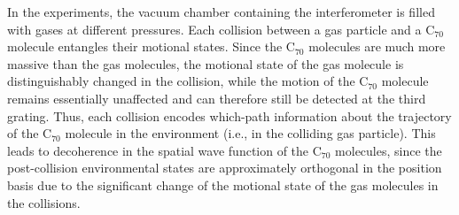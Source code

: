 \documentclass[twocolumn,aps,floatfix,amsmath,amssymb,showpacs,nofootinbib]{revtex4}
\begin{document}
In the experiments, the vacuum chamber containing the interferometer
is filled with gases at different pressures. Each collision between a
gas particle and a C$_{70}$ molecule entangles their motional states.
Since the C$_{70}$ molecules are much more massive than the gas
molecules, the motional state of the gas molecule is distinguishably
changed in the collision, while the motion of the C$_{70}$ molecule
remains essentially unaffected and can therefore still be detected at
the third grating. Thus, each collision encodes which-path information
about the trajectory of the C$_{70}$ molecule in the environment
(i.e., in the colliding gas particle). This leads to decoherence in
the spatial wave function of the C$_{70}$ molecules, since the
post-collision environmental states are approximately orthogonal in
the position basis due to the significant change of the motional state
of the gas molecules in the collisions.
\end{document}
